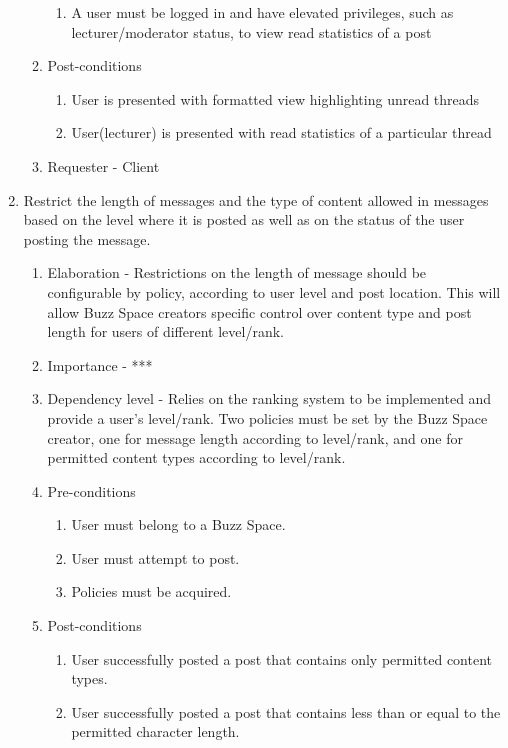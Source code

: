 \documentclass[12pt]{article}
\begin{document}
\begin{enumerate}
\begin{enumerate}
\begin{enumerate}
    	\item A user must be logged in and have elevated privileges, such as lecturer/moderator status, to view read statistics of a post
    \end{enumerate}
        \item Post-conditions
    \begin{enumerate}
    	\item User is presented with formatted view highlighting unread threads
    	\item User(lecturer) is presented with read statistics of a particular thread
    \end{enumerate}
    \item Requester - Client
  \end{enumerate}
\newpage %
  \item Restrict the length of messages and the type of content allowed in messages based
on the level where it is posted as well as on the status of the user posting the
message.  %
  \begin{enumerate}
    \item Elaboration - Restrictions on the length of message should be configurable by policy, according to user level and post location. This will allow Buzz Space creators specific control over content type and post length for users of different level/rank.
    \item Importance - ***
    \item Dependency level - Relies on the ranking system to be implemented and provide a user's level/rank. Two policies must be set by the Buzz Space creator, one for message length according to level/rank, and one for permitted content types according to level/rank.
    \item Pre-conditions
    \begin{enumerate}
    	\item User must belong to a Buzz Space.
    	\item User must attempt to post.
	\item Policies must be acquired.
    \end{enumerate}
        \item Post-conditions
    \begin{enumerate}
    	\item User successfully posted a post that contains only permitted content types.
    	\item User successfully posted a post that contains less than or equal to the permitted character length.

\end{enumerate}
\end{enumerate}
\end{enumerate}
\end{document}
